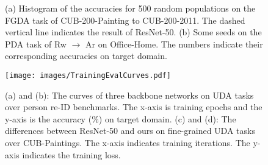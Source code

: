 \documentclass[10pt,twocolumn,letterpaper]{article}
\begin{document}
\begin{table}
    \centering
    \caption{Comparison of the rank correlation between the estimation results via the accuracy on source domain and that via our evaluation protocol.}
    \label{tab:RankCorrelationComparison}
    \small{
    }
\end{table} 








\begin{figure}\centering
    \vfill
    \caption{(a) Histogram of the accuracies for 500 random populations on the FGDA task of CUB-200-Painting to CUB-200-2011. The dashed vertical line indicates the result of ResNet-50.
    (b) Some seeds on the PDA task of Rw $\to$ Ar on Office-Home. The numbers indicate their corresponding accuracies on target domain.}
    \label{fig:HistOf500RandConfigs}
    \vspace{-4mm}
\end{figure} \begin{figure}
    \centering
    \texttt{[image: images/TrainingEvalCurves.pdf]}
    \caption{(a) and (b): The curves of three backbone networks on UDA tasks over person re-ID benchmarks. The x-axis is training epochs and the y-axis is the accuracy ($\%$) on target domain.
    (c) and (d): The differences between ResNet-50 and ours on fine-grained UDA tasks over CUB-Paintings. The x-axis indicates training iterations. The y-axis indicates the training loss.}
    \label{fig:VisTrainingEvalCurves}
    \vspace{-4mm}
\end{figure} 
\vspace{-2mm}
\end{document}
